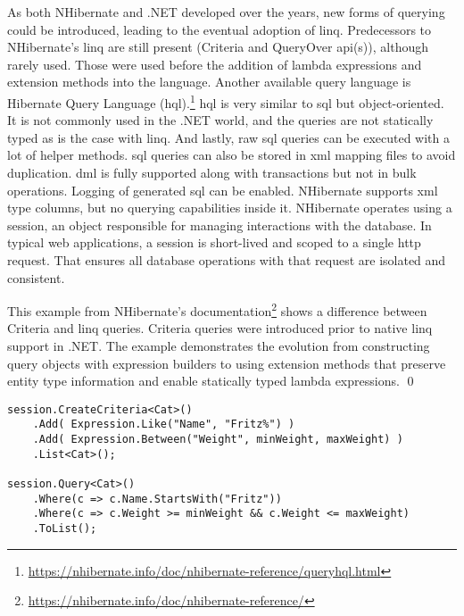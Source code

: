 As both NHibernate and .NET developed over the years, new forms of querying could be introduced, leading to the eventual adoption of \acrshort{linq}. Predecessors to NHibernate's \acrshort{linq} are still present (Criteria and QueryOver \acrshort{api}(s)), although rarely used. Those were used before the addition of lambda expressions and extension methods into the language. Another available query language is Hibernate Query Language (\acrshort{hql}).\footnote{\url{https://nhibernate.info/doc/nhibernate-reference/queryhql.html}} \acrshort{hql} is very similar to \acrshort{sql} but object-oriented. It is not commonly used in the .NET world, and the queries are not statically typed as is the case with \acrshort{linq}. And lastly, raw \acrshort{sql} queries can be executed with a lot of helper methods. \acrshort{sql} queries can also be stored in \acrshort{xml} mapping files to avoid duplication. \acrshort{dml} is fully supported along with transactions but not in bulk operations. Logging of generated \acrshort{sql} can be enabled. NHibernate supports \acrshort{xml} type columns, but no querying capabilities inside it. NHibernate operates using a session, an object responsible for managing interactions with the database. In typical web applications, a session is short-lived and scoped to a single \acrshort{http} request. That ensures all database operations with that request are isolated and consistent.

\begin{example}
\small
This example from NHibernate's documentation\footnote{\url{https://nhibernate.info/doc/nhibernate-reference/}} shows a difference between Criteria and \acrshort{linq} queries. Criteria queries were introduced prior to native \acrshort{linq} support in .NET. The example demonstrates the evolution from constructing query objects with expression builders to using extension methods that preserve entity type information and enable statically typed lambda expressions.
\qed

\begin{lstlisting}[language=CSharp]
session.CreateCriteria<Cat>()
    .Add( Expression.Like("Name", "Fritz%") )
    .Add( Expression.Between("Weight", minWeight, maxWeight) )
    .List<Cat>();

session.Query<Cat>()
    .Where(c => c.Name.StartsWith("Fritz"))
    .Where(c => c.Weight >= minWeight && c.Weight <= maxWeight)
    .ToList();
\end{lstlisting}
\end{example}

